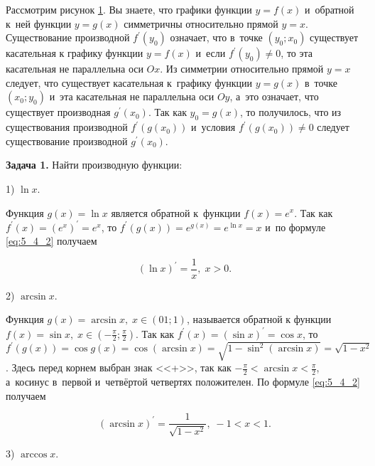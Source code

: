 \begin{figure}\label{fig:5_4_1}
\end{figure}

Рассмотрим рисунок \ref{fig:5_4_1}. Вы знаете, что графики функции $y = f(x)$
и~обратной к~ней функции $y = g(x)$ симметричны относительно прямой $y = x$.
Существование производной $f^\prime (y_{0})$ означает, что в~точке $(y_{0}; x_{0})$
существует касательная к графику функции $y = f(x)$ и~если $f^\prime (y_{0}) \ne 0$,
то эта касательная не параллельна оси $Ox$. Из симметрии относительно прямой
$y = x$ следует, что существует касательная к~графику функции $y = g(x)$
в~точке $(x_{0}; y_{0})$ и~эта касательная не параллельна оси $Oy$,
а~это означает, что существует производная $g^\prime (x_{0})$.
Так как $y_{0} = g(x)$, то получилось, что из существования производной
$f^\prime \left( g(x_{0}) \right)$ и~условия $f^\prime \left( g(x_{0}) \right) \ne 0$
следует существование производной $g^\prime (x_{0})$.

\textbf{Задача 1.}\label{ex:5_4_1} Найти производную функции:

1) $\ln x$.

Функция $g(x) = \ln x$ является обратной к~функции $f(x) = e^{x}$.
Так как $f^\prime (x) = (e^{x})^\prime = e^{x}$,
то $f^\prime \left( g(x) \right) = e^{g(x)} = e^{\ln x} = x$
и~по формуле \eqref{eq:5_4_2} получаем

\begin{equation}\label{eq:5_4_3}
\displaystyle (\ln x)^\prime = \frac{1}{x}, \; x > 0.
\end{equation}

2) $\arcsin x$.

Функция $g(x) = \arcsin x, \; x \in (01; 1)$, называется обратной к функции
$\displaystyle f(x) = \sin x, \; x \in \left( -\frac{\pi}{2}; \frac{\pi}{2} \right)$.
Так как $f^\prime (x) = (\sin x)^\prime = \cos x$, то
$f^\prime \left( g(x) \right) = \cos g(x) = \cos (\arcsin x) =
\sqrt{1 - \sin^{2} (\arcsin x)} = \sqrt{1 - x^{2}}$.
Здесь перед корнем выбран знак <<+>>, так как
$\displaystyle -\frac{\pi}{2} < \arcsin x < \frac{\pi}{2}$,
а~косинус в~первой и~четвёртой четвертях положителен.
По формуле \eqref{eq:5_4_2} получаем

\begin{equation}\label{eq:5_4_4}
\displaystyle (\arcsin x)^\prime = \frac{1}{\sqrt{1 - x^{2}}}, \; -1 < x < 1.
\end{equation}

3) $\arccos x$.

